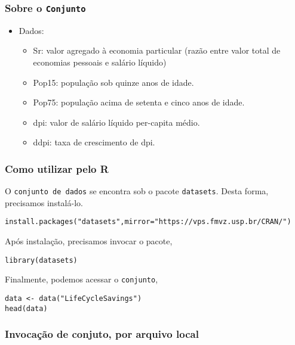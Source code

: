 \documentclass[11pt]{article}
\begin{document}
\subsubsection{Sobre o \texttt{Conjunto}}
\label{sec:orgbe83ee1}
\begin{itemize}
\item Dados:
\begin{itemize}
\item Sr: valor agregado à economia particular (razão entre valor total de economias pessoais e salário líquido)
\item Pop15: população sob quinze anos de idade.
\item Pop75: população acima de setenta e cinco anos de idade.
\item dpi: valor de salário líquido per-capita médio.
\item ddpi: taxa de crescimento de dpi.
\end{itemize}
\end{itemize}

\subsubsection{Como utilizar pelo R}
\label{sec:org1210b97}
O \texttt{conjunto de dados} se encontra sob o pacote \texttt{datasets}. Desta forma, precisamos
instalá-lo.

\begin{verbatim}
install.packages("datasets",mirror="https://vps.fmvz.usp.br/CRAN/")
\end{verbatim}

Após instalação, precisamos invocar o pacote,
\begin{verbatim}
library(datasets)
\end{verbatim}

Finalmente, podemos acessar o \texttt{conjunto},
\begin{verbatim}
data <- data("LifeCycleSavings")
head(data)
\end{verbatim}
\subsubsection{Invocação de conjuto, por arquivo local}
\label{sec:org09a955a}
\end{document}
